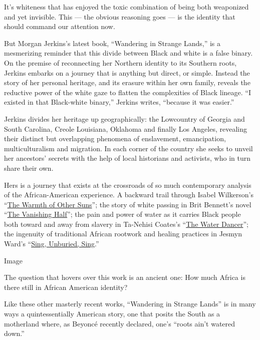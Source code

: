 It's whiteness that has enjoyed the toxic combination of being both
weaponized and yet invisible. This --- the obvious reasoning goes --- is
the identity that should command our attention now.

But Morgan Jerkins's latest book, ``Wandering in Strange Lands,'' is a
mesmerizing reminder that this divide between Black and white is a false
binary. On the premise of reconnecting her Northern identity to its
Southern roots, Jerkins embarks on a journey that is anything but
direct, or simple. Instead the story of her personal heritage, and its
erasure within her own family, reveals the reductive power of the white
gaze to flatten the complexities of Black lineage. ``I existed in that
Black-white binary,'' Jerkins writes, ``because it was easier.''

Jerkins divides her heritage up geographically: the Lowcountry of
Georgia and South Carolina, Creole Louisiana, Oklahoma and finally Los
Angeles, revealing their distinct but overlapping phenomena of
enslavement, emancipation, multiculturalism and migration. In each
corner of the country she seeks to unveil her ancestors' secrets with
the help of local historians and activists, who in turn share their own.

Hers is a journey that exists at the crossroads of so much contemporary
analysis of the African-American experience. A backward trail through
Isabel Wilkerson's
``\href{https://www.nytimes.com/2010/08/31/books/31book.html}{The Warmth
of Other Suns}''; the story of white passing in Brit Bennett's novel
``\href{https://www.nytimes.com/2020/05/26/books/review-vanishing-half-brit-bennett.html}{The
Vanishing Half}''; the pain and power of water as it carries Black
people both toward and away from slavery in Ta-Nehisi Coates's
``\href{https://www.nytimes.com/2019/09/24/books/review/water-dancer-ta-nehisi-coates.html}{The
Water Dancer}''; the ingenuity of traditional African rootwork and
healing practices in Jesmyn Ward's
``\href{https://www.nytimes.com/2017/09/05/books/review-sing-unburied-sing-jesmyn-ward.html}{Sing,
Unburied, Sing}.''

Image

The question that hovers over this work is an ancient one: How much
Africa is there still in African American identity?

Like these other masterly recent works, ``Wandering in Strange Lands''
is in many ways a quintessentially American story, one that posits the
South as a motherland where, as Beyoncé recently declared, one's ``roots
ain't watered down.''

